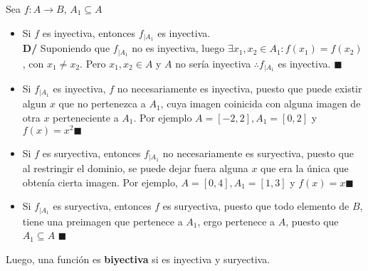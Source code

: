 \documentclass[11pt,a4paper]{article}
\newcommand*{\QEDA}{\null\nobreak\hfill\ensuremath{\blacksquare}}
\begin{document}
Sea $f : A \rightarrow B$, $A_1 \subseteq A$
\begin{itemize}
\item Si $f$ es inyectiva, entonces $f_{|A_1}$ es inyectiva.\\
\textbf{D/} Suponiendo que $f_{|A_1}$ no es inyectiva, luego $\exists x_1, x_2 \in A_1 : f(x_1) = f(x_2)$, con $x_1 \not = x_2$. Pero $x_1, x_2 \in A$ y $A$ no ser\'ia inyectiva $\therefore f_{|A_1}$ es inyectiva. \QEDA
\item Si $f_{|A_1}$ es inyectiva, $f$ no necesariamente es inyectiva, puesto que puede existir algun $x$ que no pertenezca a $A_1$, cuya imagen coinicida con alguna imagen de otra $x$ perteneciente a $A_1$. Por ejemplo $A = [-2,2], A_1 = [0,2]$ y $f(x)=x^2$\QEDA
\item Si $f$ es suryectiva, entonces $f_{|A_1}$ no necesariamente es suryectiva, puesto que al restringir el dominio, se puede dejar fuera alguna $x$ que era la \'unica que obten\'ia cierta imagen. Por ejemplo, $A=[0,4], A_1 = [1,3]$ y $f(x)=x$\QEDA
\item Si $f_{|A_1}$ es suryectiva, entonces $f$ es suryectiva, puesto que todo elemento de $B$, tiene una preimagen que pertenece a $A_1$, ergo pertenece a $A$, puesto que $A_1 \subseteq A$ \QEDA
\end{itemize}

\noindent Luego, una funci\'on es \textbf{biyectiva} si es inyectiva y suryectiva.\\
\end{document}
